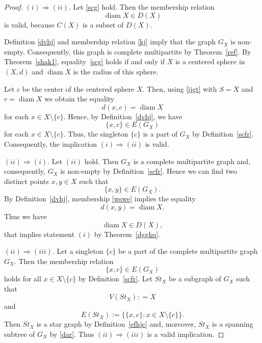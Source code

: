\documentclass{article}
\begin{document}
\begin{proof}
    $(i) \Rightarrow (ii)$.
Let \eqref{scg} hold. Then the membership relation
\begin{equation}
    \label{kj}
\operatorname{diam} X\in D(X)
\end{equation}
is valid, because $C(X)$ is a subset of $D(X)$. 



Definition \ref{dvhj}
and  membership relation \eqref{kj} imply that the graph $G_X$ is non-empty.
Consequently, this graph is complete multipartite by Theorem~\ref{ref}.
By Theorem~\ref{shak1}, equality~\eqref{scg} holds if and only if $X$ is a centered sphere in $(X,d)$ and $\operatorname{diam} X$ is the radius of this sphere.

Let $c$ be the center of the centered sphere $X$.
Then, using \eqref{ijgt} with $S=X$ and $r=\operatorname{diam} X$ we obtain the equality
\begin{equation*}
d(x,c)=\operatorname{diam} X
\end{equation*}
for each $x\in X\setminus\{c\}$.
Hence, by Definition~\ref{dvhj}, we have
\begin{equation*}
\{x,c\}\in E(G_X)
\end{equation*}
for each $x\in X\setminus\{c\}$.
Thus, the singleton $\{c\}$ is a part of $G_X$ by Definition~\ref{scfr}.
Consequently, the implication $(i)\Rightarrow(ii)$ is valid.

$(ii)\Rightarrow(i)$.
Let $(ii)$ hold.
Then $G_X$ is a complete multipartite graph and, consequently, $G_X$ is non-empty by Definition~\ref{scfr}.
Hence we can find two distinct points $x,y\in X$ such that
\begin{equation}
    \label{wswe}
\{x,y\}\in E(G_X).
\end{equation}
By Definition~\ref{dvhj}, membership \eqref{wswe} implies the equality
\[
d(x,y)=\operatorname{diam} X.
\]
Thus we have 
\begin{equation*}
    \operatorname{diam} X\in D(X),
\end{equation*}
 that implies statement $(i)$ by Theorem~\ref{dggkq}.

$(ii)\Rightarrow (iii)$. 
Let a singleton $\{c\}$ be a part of the complete multipartite graph $G_X$.
Then the membership relation
\[
\{x,c\}\in E(G_X)
\]
holds for all $x\in X\setminus\{c\}$ by Definition~\ref{scfr}.
Let $St_X$ be a subgraph of $G_X$ such that
\begin{equation}
    \label{dar}
V(St_X): = X
\end{equation}
and
\begin{equation}
        \label{alph00}
E(St_X):=\{\{x,c\}\colon x\in X\setminus\{c\}\}.
\end{equation}
Then $St_X$ is a star graph by Definition~\ref{efhjc} and, moreover,  $St_X$ is a spanning subtree of $G_X$ by \eqref{dar}.
Thus $(ii)\Rightarrow(iii)$ is a valid implication.


\end{proof}
\end{document}
